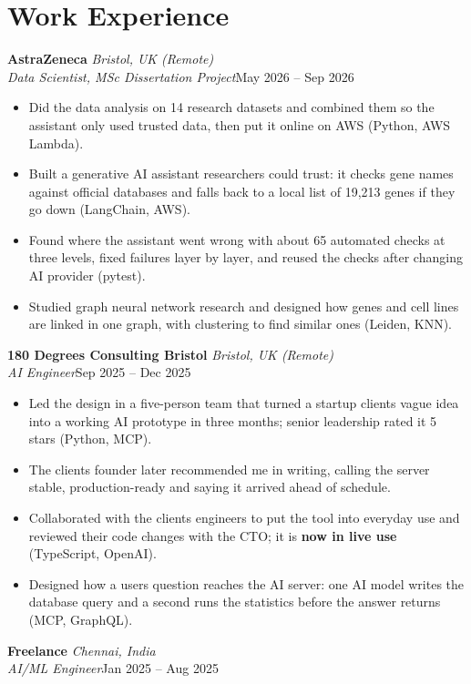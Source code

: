 \documentclass[a4paper,11pt]{article}
\newcommand{\role}[4]{%
  \textbf{#1}{\color{muted}\,\textperiodcentered\,\textit{#2}}\\
  \textit{#4}\hfill{\color{muted}#3}\par}
\newcommand{\gap}{\vspace{5pt}}
\newcommand{\num}[1]{\textbf{#1}}   %
\begin{document}
\section{Work Experience}
\role{AstraZeneca}{Bristol, UK (Remote)}{May 2026 – Sep 2026}{Data Scientist, MSc Dissertation Project}
\begin{itemize}
  \item Did the data analysis on 14 research datasets and combined them so the assistant only used trusted data, then put it online on AWS (Python, AWS Lambda).
  \item Built a generative AI assistant researchers could trust: it checks gene names against official databases and falls back to a local list of 19,213 genes if they go down (LangChain, AWS).
  \item Found where the assistant went wrong with about 65 automated checks at three levels, fixed failures layer by layer, and reused the checks after changing AI provider (pytest).
  \item Studied graph neural network research and designed how genes and cell lines are linked in one graph, with clustering to find similar ones (Leiden, KNN).
\end{itemize}
\gap
{}
\role{180 Degrees Consulting Bristol}{Bristol, UK (Remote)}{Sep 2025 – Dec 2025}{AI Engineer}
\begin{itemize}
  \item Led the design in a five-person team that turned a startup client\textquotesingle{}s vague idea into a working AI prototype in three months; senior leadership rated it 5 stars (Python, MCP).
  \item The client\textquotesingle{}s founder later recommended me in writing, calling the server \textquotesingle{}stable, production-ready\textquotesingle{} and saying it arrived ahead of schedule.
  \item Collaborated with the client\textquotesingle{}s engineers to put the tool into everyday use and reviewed their code changes with the CTO; it is \num{now in live use} (TypeScript, OpenAI).
  \item Designed how a user\textquotesingle{}s question reaches the AI server: one AI model writes the database query and a second runs the statistics before the answer returns (MCP, GraphQL).
\end{itemize}
\gap
{}
\role{Freelance}{Chennai, India}{Jan 2025 – Aug 2025}{AI/ML Engineer}
\end{document}
